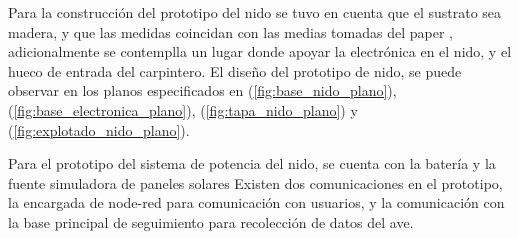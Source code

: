 %

Para la construcción del prototipo del nido se tuvo en cuenta que el sustrato sea madera, y que las medidas coincidan con las medias tomadas del paper \cite{ref:varepsilon_madera}, adicionalmente se contemplla un lugar donde apoyar la electrónica en el nido, y el hueco de entrada del carpintero.
El diseño del prototipo de nido, se puede observar en los planos especificados en (\ref{fig:base_nido_plano}), (\ref{fig:base_electronica_plano}), (\ref{fig:tapa_nido_plano}) y (\ref{fig:explotado_nido_plano}).
\TBC
{}
\TBC

Para el prototipo del sistema de potencia del nido, se cuenta con la batería \TBC y la fuente simuladora de paneles solares \TBC 
{}
Existen dos comunicaciones en el prototipo, la encargada de node-red para comunicación con usuarios, y la comunicación con la base principal de seguimiento para recolección de datos del ave.

